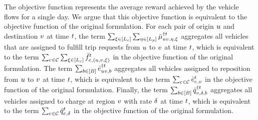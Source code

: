 The objective function represents the average reward achieved by the vehicle flows for a single day. We argue that this objective function is equivalent to the objective function of the original formulation. For each pair of origin $u$ and destination $v$ at time $t$, the term $\sum_{\xi \in [L_c]} \sum_{\eta \in [L_p]} \bar{\mu}^{\dagger t}_{u v, \eta, \xi}$ aggregates all vehicles that are assigned to fulfill trip requests from $u$ to $v$ at time $t$, which is equivalent to the term $\sum_{c_{} \in \mathcal{C}} \sum_{\xi \in [L_c]} \bar{f}^{t}_{c_{}, (u, v, \xi)}$ in the objective function of the original formulation. The term $\sum_{b \in [B]} \bar{e}^{\dagger t}_{u v, b}$ aggregates all vehicles assigned to reposition from $u$ to $v$ at time $t$, which is equivalent to the term $\sum_{c_{} \in \mathcal{C}} \bar{e}^{t}_{c_{}, v}$ in the objective function of the original formulation. Finally, the term $\sum_{b \in [B]} \bar{q}^{\dagger t}_{v, \delta, b}$ aggregates all vehicles assigned to charge at region $v$ with rate $\delta$ at time $t$, which is equivalent to the term $\sum_{c_{} \in \mathcal{C}} \bar{q}^{t}_{c_{}, \delta}$ in the objective function of the original formulation.

